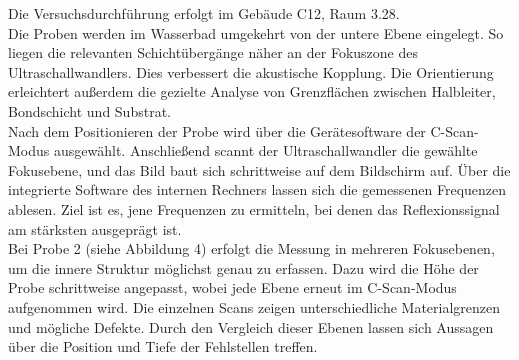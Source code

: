 
Die Versuchsdurchführung erfolgt im Gebäude C12, Raum 3.28. \\
Die Proben werden im Wasserbad umgekehrt von der untere Ebene eingelegt. So liegen die relevanten Schichtübergänge näher an der Fokuszone des Ultraschallwandlers. Dies verbessert die akustische Kopplung. Die Orientierung erleichtert außerdem die gezielte Analyse von Grenzflächen zwischen Halbleiter, Bondschicht und Substrat. \\
Nach dem Positionieren der Probe wird über die Gerätesoftware der C-Scan-Modus ausgewählt. Anschließend scannt der Ultraschallwandler die gewählte Fokusebene, und das Bild baut sich schrittweise auf dem Bildschirm auf. Über die integrierte Software des internen Rechners lassen sich die gemessenen Frequenzen ablesen. Ziel ist es, jene Frequenzen zu ermitteln, bei denen das Reflexionssignal am stärksten ausgeprägt ist.\\
Bei Probe 2 (siehe Abbildung 4) erfolgt die Messung in mehreren Fokusebenen, um die innere Struktur möglichst genau zu erfassen. Dazu wird die Höhe der Probe schrittweise angepasst, wobei jede Ebene erneut im C-Scan-Modus aufgenommen wird. Die einzelnen Scans zeigen unterschiedliche Materialgrenzen und mögliche Defekte. Durch den Vergleich dieser Ebenen lassen sich Aussagen über die Position und Tiefe der Fehlstellen treffen.